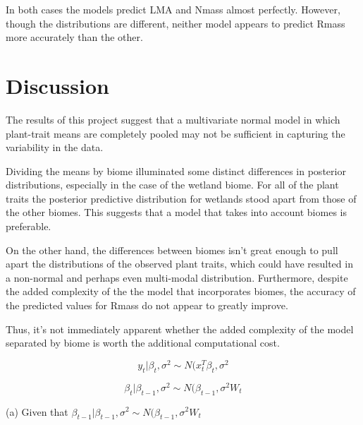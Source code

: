 \documentclass[11pt]{article}
\theoremstyle{definition}
\theoremstyle{remark}
\theoremstyle{definition}
\begin{document}
In both cases the models predict LMA and Nmass almost perfectly. However, though the distributions are different, neither model appears to predict Rmass more accurately than the other. 

\section{Discussion}

The results of this project suggest that a multivariate normal model in which plant-trait means are completely pooled may not be sufficient in capturing the variability in the data. 

Dividing the means by biome illuminated some distinct differences in posterior distributions, especially in the case of the wetland biome. For all of the plant traits the posterior predictive distribution for wetlands stood apart from those of the other biomes. This suggests that a model that takes into account biomes is preferable. 

 On the other hand, the differences between biomes isn't great enough to pull apart the distributions of the observed plant traits, which could have resulted in a non-normal and perhaps even multi-modal distribution. Furthermore, despite the added complexity of the the model that incorporates biomes, the accuracy of the predicted values for Rmass do not appear to greatly improve. 
 
 Thus, it's not immediately apparent whether the added complexity of the model separated by biome is worth the additional computational cost. 
 
















$$y_t | \beta_t, \sigma^2 \sim N(x_t^T \beta_t, \sigma^2 $$


$$\beta_t | \beta_{t-1}, \sigma^2 \sim N(\beta_{t-1}, \sigma^2 W_t $$

(a) Given that $\beta_{t-1} | \beta_{t-1}, \sigma^2 \sim N(\beta_{t-1}, \sigma^2 W_t $










































\newpage

\end{document}
